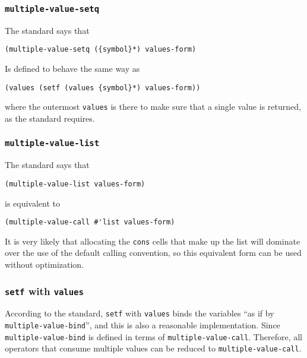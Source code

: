 \subsubsection{\texttt{multiple-value-setq}}

The standard says that

\begin{verbatim}
(multiple-value-setq ({symbol}*) values-form)
\end{verbatim}

Is defined to behave the same way as

\begin{verbatim}
(values (setf (values {symbol}*) values-form))
\end{verbatim}

where the outermost \texttt{values} is there to make sure that a
single value is returned, as the standard requires. 

\subsubsection{\texttt{multiple-value-list}}

The standard says that

\begin{verbatim}
(multiple-value-list values-form)
\end{verbatim}

is equivalent to

\begin{verbatim}
(multiple-value-call #'list values-form)
\end{verbatim}

It is very likely that allocating the \texttt{cons} cells that make up
the list will dominate over the use of the default calling convention,
so this equivalent form can be used without optimization. 

\subsubsection{\texttt{setf} with \texttt{values}}

According to the standard, \texttt{setf} with \texttt{values} binds
the variables ``as if by \texttt{multiple-value-bind}'', and this is
also a reasonable implementation.  Since \texttt{multiple-value-bind}
is defined in terms of \texttt{multiple-value-call}.  Therefore, all
operators that consume multiple values can be reduced to
\texttt{multiple-value-call}.

